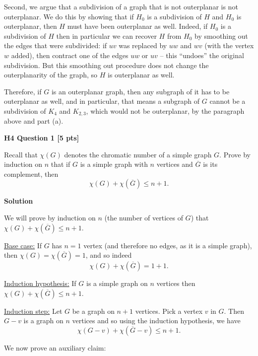 \documentclass[10pt,landscape]{article}
\renewcommand{\leq}{\leqslant}
\begin{document}
\begin{multicols}{2}
\begin{enumerate}[(a)]
Second, we argue that a subdivision of a graph that is not outerplanar is not outerplanar. We do this by showing that if $H_0$ is a subdivision of $H$ and $H_0$ is outerplanar, then $H$ must have been outerplanar as well. Indeed, if $H_0$ is a subdivision of $H$ then in particular we can recover $H$ from $H_0$ by smoothing out the edges that were subdivided: if $uv$ was replaced by $uw$ and $wv$ (with the vertex $w$ added), then contract one of the edges $uw$ or $uv$ -- this ``undoes'' the original subdivision. But this smoothing out procedure does not change the outerplanarity of the graph,  so $H$ is outerplanar as well.


Therefore, if $G$ is an outerplanar graph, then any subgraph of it has to be outerplanar as well, and in particular, that means a subgraph of $G$ cannot be a subdivision of $K_4$ and $K_{2,3}$, which would not be outerplanar, by the paragraph above and part (a).



\end{enumerate}

\textbf{H4 Question 1 [5 pts]}

Recall that $\chi(G)$ denotes the chromatic number of a simple graph $G$. Prove by induction on $n$ that if $G$ is a simple graph with $n$ vertices and $\overline{G}$ is its complement, then 
    $$\chi(G) +\chi(\overline{G})\leq n+1.$$

\textbf{Solution}

We will prove by induction on $n$ (the number of vertices of $G$) that $\chi(G) +\chi(\overline{G})\leq n+1.$

\noindent \underline{Base case:} If $G$ has $n=1$ vertex (and therefore no edges, as it is a simple graph), then $\chi(G)=\chi(\overline G)=1$, and so indeed \\
$$\chi(G)+\chi(\overline G)=1+1.$$

\noindent \underline{Induction hypothesis:} If $G$ is a simple graph on $n$ vertices then $\chi(G)+\chi(\overline G)\leq n+1$.

\noindent \underline{Induction step:} Let $G$ be a graph on $n+1$ vertices. Pick a vertex $v$ in $G$. Then $G-v$ is a graph on $n$ vertices and so using the induction hypothesis, we have\\
\begin{equation}\label{first}
\chi(G-v)+\chi(\overline G-v)\leq n+1.
\end{equation}

We now prove an auxiliary claim:


\end{multicols}
\end{document}
